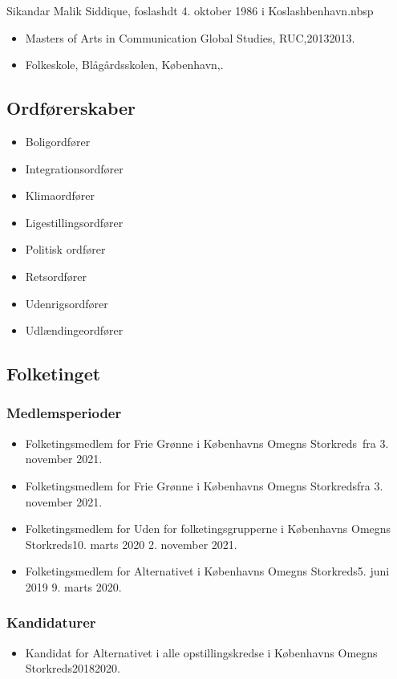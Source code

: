 \documentclass[11pt, a4paper]{awesome-cv}
\begin{document}
\makecvheader[R]
\makelettertitle
\begin{cvletter}
Sikandar Malik Siddique, foslashdt 4. oktober 1986 i Koslashbenhavn.nbsp

\begin{itemize}
\item Masters of Arts in Communication  Global Studies, RUC,20132013.
\item Folkeskole, Blågårdsskolen, København,.
\end{itemize}
\subsection*{Ordførerskaber}
\begin{itemize}
\item Boligordfører
\item Integrationsordfører
\item Klimaordfører
\item Ligestillingsordfører
\item Politisk ordfører
\item Retsordfører
\item Udenrigsordfører
\item Udlændingeordfører
\end{itemize}
\subsection*{Folketinget}
\subsubsection*{Medlemsperioder}
\begin{itemize}
\item Folketingsmedlem for Frie Grønne i Københavns Omegns Storkreds fra 3. november 2021.
\item Folketingsmedlem for Frie Grønne i Københavns Omegns Storkredsfra 3. november 2021.
\item Folketingsmedlem for Uden for folketingsgrupperne i Københavns Omegns Storkreds10. marts 2020  2. november 2021.
\item Folketingsmedlem for Alternativet i Københavns Omegns Storkreds5. juni 2019  9. marts 2020.
\end{itemize}
\subsubsection*{Kandidaturer}
\begin{itemize}
\item Kandidat for Alternativet i alle opstillingskredse i Københavns Omegns Storkreds20182020.
\end{itemize}
\end{cvletter}
\end{document}
